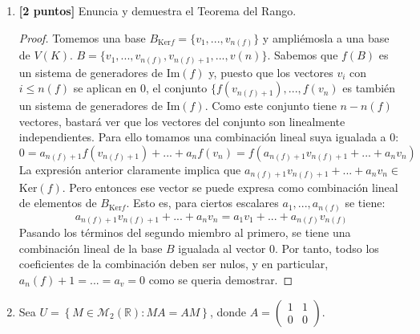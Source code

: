 \documentclass[12pt]{article}
\begin{document}
\begin{enumerate}
	\item \textbf{[2 puntos]} Enuncia y demuestra el Teorema del Rango.
	      \begin{proof}
		      Tomemos una base $B_{\text{Ker}f}=\{ v_1,...,v_{n(f)}\}$ y ampliémosla a una base de $V(K)$. $B=\{v_1,...,v_{n(f)},
			      v_{n(f)+1}, ..., v(n)\}$. Sabemos que $f(B)$ es un sistema de generadores de Im$(f)$ y, puesto que
		      los vectores $v_i$ con $i \leq n(f)$ se aplican en 0, el conjunto $\{f(v_{n(f)+1}),...,f(v_n)$ es también un sistema
		      de generadores de Im$(f)$. Como este conjunto tiene $n - n(f)$ vectores, bastará ver que los vectores del conjunto son
		      linealmente independientes. Para ello tomamos una combinación lineal suya igualada a 0:
		      \begin{equation*}
			      0 = a_{n(f)+1} f(v_{n(f)+1})+...+a_n f(v_n) = f(a_{n(f)+1}v_{n(f)+1}+...+a_n v_n)
		      \end{equation*}
		      La expresión anterior claramente implica que $a_{n(f)+1}v_{n(f)+1}+...+a_n v_n \in$ Ker$(f)$. Pero entonces ese vector
		      se puede expresa como combinación lineal de elementos de $B_{\text{Ker}f}$. Esto es, para ciertos escalares
		      $a_1,...,a_{n(f)}$ se tiene:
		      \begin{equation*}
			      a_{n(f)+1}v_{n(f)+1}+...+a_n v_n = a_1 v_1+...+a_{n(f)}v_{n(f)}
		      \end{equation*}
		      Pasando los términos del segundo miembro al primero, se tiene una combinación lineal de la base $B$ igualada al vector
		      0. Por tanto, todso los coeficientes de la combinación deben ser nulos, y en particular, $a_n(f)+1 = ... = a_v = 0$
		      como se queria demostrar.
	      \end{proof}

	\item Sea $\displaystyle U = \left\{ M \in \mathcal{M}_2(\mathbb{R}) : MA = AM \right\}$, donde $\displaystyle A = \left( \begin{array}{cc}
				      1 & 1 \\
				      0 & 0
			      \end{array}\right)$.


\end{enumerate}
\end{document}
